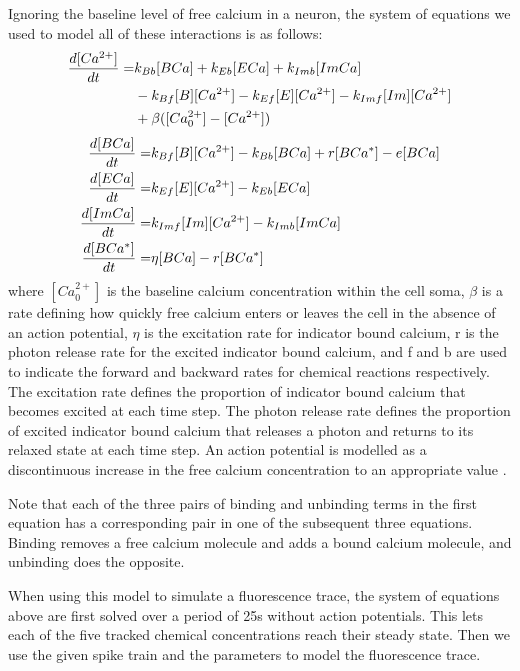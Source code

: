 Ignoring the baseline level of free calcium in a neuron, the system of equations we used to model all of these interactions is as follows:
\begin{equation} \label{eq:model_equations}
  \begin{split}
  \frac{d [Ca^{2+}]}{d t} = & k_{Bb}[BCa] + k_{Eb}[ECa] + k_{Imb}[ImCa] \\
                      & - k_{Bf}[B][Ca^{2+}]- k_{Ef} [E][Ca^{2+}] - k_{Imf}[Im][Ca^{2+}] \\
                      & + \beta ([Ca^{2+}_{0}] - [Ca^{2+}])
  \end{split}
\end{equation}
\begin{align}
  \frac{d [BCa]}{d t} = & k_{Bf}[B][Ca^{2+}] - k_{Bb}[BCa] + r[BCa^{*}] - e[BCa] \\
  \frac{d [ECa]}{d t} = & k_{Ef}[E][Ca^{2+}] - k_{Eb}[ECa] \\
  \frac{d [ImCa]}{d t} = & k_{Imf}[Im][Ca^{2+}] - k_{Imb}[ImCa] \\
  \frac{d [BCa^{*}]}{d t} = & \eta[BCa] - r[BCa^{*}]
\end{align}
where $[Ca^{2+}_{0}]$ is the baseline calcium concentration within the cell soma, $\beta$ is a rate defining how quickly free calcium enters or leaves the cell in the absence of an action potential, $\eta$ is the excitation rate for indicator bound calcium, r is the photon release rate for the excited indicator bound calcium, and f and b are used to indicate the forward and backward rates for chemical reactions respectively. The excitation rate defines the proportion of indicator bound calcium that becomes excited at each time step. The photon release rate defines the proportion of excited indicator bound calcium that releases a photon and returns to its relaxed state at each time step. An action potential is modelled as a discontinuous increase in the free calcium concentration to an appropriate value  \parencite{maravall}.

Note that each of the three pairs of binding and unbinding terms in the first equation has a corresponding pair in one of the subsequent three equations. Binding removes a free calcium molecule and adds a bound calcium molecule, and unbinding does the opposite.

When using this model to simulate a fluorescence trace, the system of equations above are first solved over a period of 25s without action potentials. This lets each of the five tracked chemical concentrations reach their steady state. Then we use the given spike train and the parameters to model the fluorescence trace.

